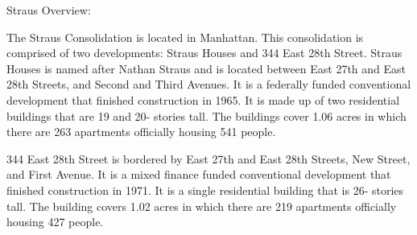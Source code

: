 Straus Overview:      

    

The Straus Consolidation is located in Manhattan. This consolidation is comprised of two developments: Straus Houses and 344 East 28th Street. Straus Houses is named after Nathan Straus and is located between East 27th and East 28th Streets, and Second and Third Avenues. It is a federally funded conventional development that finished construction in 1965. It is made up of two residential buildings that are 19 and 20- stories tall. The buildings cover 1.06 acres in which there are 263 apartments officially housing 541 people.  

344 East 28th Street is bordered by East 27th and East 28th Streets, New Street, and First Avenue. It is a mixed finance funded conventional development that finished construction in 1971. It is a single residential building that is 26- stories tall. The building covers 1.02 acres in which there are 219 apartments officially housing 427 people.  